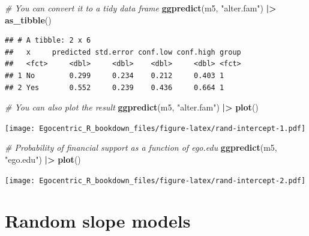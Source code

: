 \documentclass[
]{book}
\newenvironment{Shaded}{\begin{snugshade}}{\end{snugshade}}
\newcommand{\CommentTok}[1]{\textcolor[rgb]{0.56,0.35,0.01}{\textit{#1}}}
\newcommand{\FunctionTok}[1]{\textcolor[rgb]{0.13,0.29,0.53}{\textbf{#1}}}
\newcommand{\NormalTok}[1]{#1}
\newcommand{\SpecialCharTok}[1]{\textcolor[rgb]{0.81,0.36,0.00}{\textbf{#1}}}
\newcommand{\StringTok}[1]{\textcolor[rgb]{0.31,0.60,0.02}{#1}}
\begin{document}
\begin{Shaded}
\begin{Highlighting}[]
\CommentTok{\# You can convert it to a tidy data frame}
\FunctionTok{ggpredict}\NormalTok{(m5, }\StringTok{"alter.fam"}\NormalTok{) }\SpecialCharTok{|\textgreater{}}
  \FunctionTok{as\_tibble}\NormalTok{()}
\end{Highlighting}
\end{Shaded}

\begin{verbatim}
## # A tibble: 2 x 6
##   x     predicted std.error conf.low conf.high group
##   <fct>     <dbl>     <dbl>    <dbl>     <dbl> <fct>
## 1 No        0.299     0.234    0.212     0.403 1    
## 2 Yes       0.552     0.239    0.436     0.664 1
\end{verbatim}

\begin{Shaded}
\begin{Highlighting}[]
\CommentTok{\# You can also plot the result}
\FunctionTok{ggpredict}\NormalTok{(m5, }\StringTok{"alter.fam"}\NormalTok{) }\SpecialCharTok{|\textgreater{}} 
  \FunctionTok{plot}\NormalTok{()}
\end{Highlighting}
\end{Shaded}

\texttt{[image: Egocentric\_R\_bookdown\_files/figure-latex/rand-intercept-1.pdf]}

\begin{Shaded}
\begin{Highlighting}[]
\CommentTok{\# Probability of financial support as a function of ego.edu}
\FunctionTok{ggpredict}\NormalTok{(m5, }\StringTok{"ego.edu"}\NormalTok{) }\SpecialCharTok{|\textgreater{}} 
  \FunctionTok{plot}\NormalTok{()}
\end{Highlighting}
\end{Shaded}

\texttt{[image: Egocentric\_R\_bookdown\_files/figure-latex/rand-intercept-2.pdf]}

\hypertarget{random-slope-models}{%
\section{Random slope models}\label{random-slope-models}}
\end{document}
